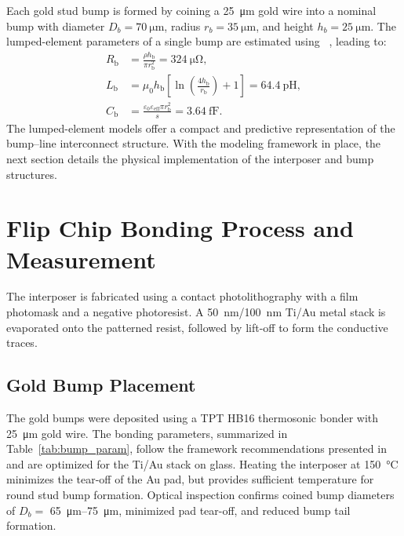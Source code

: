 \documentclass[conference]{IEEEtran}
\begin{document}
Each gold stud bump is formed by coining a \SI{25}{\micro\meter} gold wire into a nominal bump with diameter $D_b = \SI{70}{\micro\meter}$, radius $r_b=\SI{35}{\micro\meter}$, and height $h_b = \SI{25}{\micro\meter}$. The lumped-element parameters of a single bump are estimated using ~\cite{Simons2004, Grover2009,Paul1994}, leading to:
\begin{align}
    R_{\text{b}}&=\frac{\rho h_{\text{b}}}{\pi r_{\text{b}}^{2}}=\SI{324}{\micro\ohm},\\
    L_{\text{b}}&=\mu_{0}h_{\text{b}}\left[\ln\left(\frac{4h_{\text{b}}}{r_{\text{b}}}\right)+1\right]=\SI{64.4}{\pico\henry},\\
    C_{\text{b}}&=\frac{\varepsilon_{0}\varepsilon_{\text{eff}}\pi r_{\text{b}}^{2}}{s} =\SI{3.64}{\femto\farad}.
\end{align}
%
The lumped-element models offer a compact and predictive representation of the bump–line interconnect structure. With the modeling framework in place, the next section details the physical implementation of the interposer and bump structures.

\section{Flip Chip Bonding Process and Measurement}\label{sec:fabrication}
The interposer is fabricated using a contact photolithography with a film photomask and a negative photoresist. A \SI{50}{\nano\meter}/\SI{100}{\nano\meter} Ti/Au metal stack is evaporated onto the patterned resist, followed by lift-off to form the conductive traces.

\subsection{Gold Bump Placement}\label{subsec:gold_bump}
The gold bumps were deposited using a TPT HB16 thermosonic bonder with \SI{25}{\micro\metre} gold wire. The bonding parameters, summarized in Table~\ref {tab:bump_param}, follow the framework recommendations presented in \cite{Jordan2002} and are optimized for the Ti/Au stack on glass. Heating the interposer at \SI{150}{\celsius} minimizes the tear-off of the Au pad, but provides sufficient temperature for round stud bump formation. Optical inspection confirms coined bump diameters of $D_b =$ \SIrange{65}{75}{\micro\meter}, minimized pad tear-off, and reduced bump tail formation.
\end{document}
